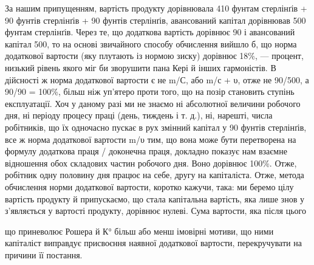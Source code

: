 За нашим припущенням, вартість продукту дорівнювала 410 фунтам стерлінґів + 90 фунтів стерлінґів +
90 фунтів стерлінґів,
авансований капітал дорівнював 500 фунтам стерлінґів. Через те, що додаткова вартість дорівнює 90 і
авансований капітал 500, то на основі звичайного способу обчислення вийшло б, що норма
додаткової вартости (яку плутають із нормою зиску) дорівнює 18\%, — процент, низький рівень якого міг
би зворушити пана Кері й інших гармоністів. В дійсності ж норма додаткової вартости є не m/С, або
m/с + υ, отже не 90/500, а 90/90 = 100\%, більш ніж уп’ятеро проти того, що на позір становить
ступінь експлуатації. Хоч у даному разі ми не знаємо ні абсолютної величини робочого дня, ні періоду
процесу праці (день, тиждень і т. д.), ні, нарешті, числа робітників, що їх одночасно пускає в рух
змінний капітал у 90 фунтів стерлінґів, все ж норма додаткової вартости m/υ тим, що вона може бути
перетворена на формулу
додаткова праця / доконечна праця, докладно показує нам взаємне відношення обох складових частин
робочого дня. Воно дорівнює 100\%. Отже, робітник одну половину дня працює на себе, другу на
капіталіста. Отже, метода обчислення норми додаткової вартости, коротко
кажучи, така: ми беремо цілу вартість продукту й припускаємо, що стала капітальна вартість, яка лише
знов у з’являється у вартості продукту, дорівнює нулеві. Сума вартости, яка після цього

що приневолює Рошера й К° більш або менш імовірні мотиви, що ними капіталіст виправдує присвоєння
наявної додаткової вартости, перекручувати на причини її постання.
\parbreak{}  %
